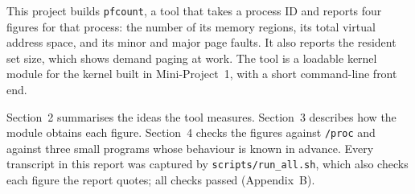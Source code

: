 This project builds \texttt{pfcount}, a tool that takes a process ID and
reports four figures for that process: the number of its memory regions, its
total virtual address space, and its minor and major page faults. It also
reports the resident set size, which shows demand paging at work. The tool is
a loadable kernel module for the \texttt{\KernelRelease} kernel built in
Mini-Project~1, with a short command-line front end.

Section~2 summarises the ideas the tool measures. Section~3 describes how the
module obtains each figure. Section~4 checks the figures against
\texttt{/proc} and against three small programs whose behaviour is known in
advance. Every transcript in this report was captured by
\texttt{scripts/run\_all.sh}, which also checks each figure the report quotes;
all \ChecksPassed{} checks passed (Appendix~B).
